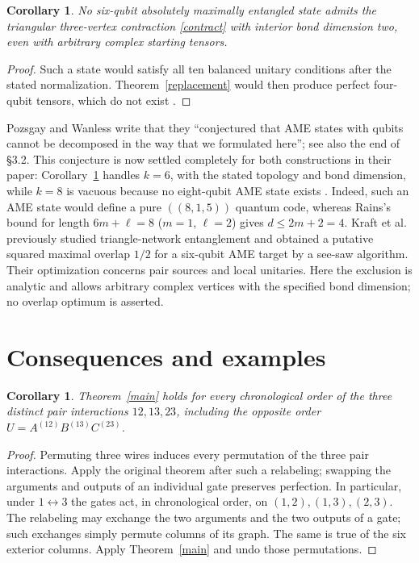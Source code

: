 \documentclass[11pt]{article}
\newtheorem{corollary}[theorem]{Corollary}
\begin{document}
\begin{corollary}\label{qubits}
No six-qubit absolutely maximally entangled state admits the triangular
three-vertex contraction \eqref{contract} with interior bond dimension
two, even with arbitrary complex starting tensors.
\end{corollary}
\begin{proof}
Such a state would satisfy all ten balanced unitary conditions after
the stated normalization. Theorem~\ref{replacement} would then produce
perfect four-qubit tensors, which do not exist
\cite[\S2]{HS}.
\end{proof}

Pozsgay and Wanless \cite[\S8]{PW} write that they ``conjectured that
AME states with qubits cannot be decomposed in the way that we
formulated here''; see also the end of \S3.2. This conjecture is now
settled completely for both constructions in their paper: Corollary~\ref{qubits}
handles $k=6$, with the stated topology and bond dimension, while $k=8$
is vacuous because no eight-qubit AME state exists
\cite[Theorem 14 in the arXiv version]{Rains}\cite[\S III, after Table I]{Scott}.
Indeed, such an AME state would define a pure $((8,1,5))$ quantum code,
whereas Rains's bound for length $6m+\ell=8$ ($m=1$, $\ell=2$) gives
$d\le 2m+2=4$.
Kraft et al.\ \cite[Table I]{Kraft}
previously studied triangle-network entanglement and obtained a
putative squared maximal overlap $1/2$ for a six-qubit AME target by a
see-saw algorithm. Their optimization concerns pair sources and local
unitaries. Here the exclusion is analytic and allows arbitrary complex
vertices with the specified bond dimension; no overlap optimum is asserted.

\section{Consequences and examples}
\begin{corollary}\label{reverse}
Theorem~\ref{main} holds for every chronological order of the three
distinct pair interactions $12,13,23$, including the opposite order
$U=A^{(12)}B^{(13)}C^{(23)}$.
\end{corollary}
\begin{proof}
Permuting three wires induces every permutation of the three pair
interactions. Apply the original theorem after such a relabeling;
swapping the arguments and outputs of an individual gate preserves
perfection. In particular, under $1\leftrightarrow3$ the gates act, in
chronological order, on $(1,2),(1,3),(2,3)$. The relabeling may exchange
the two arguments and the two outputs of a gate; such exchanges simply
permute columns of its graph. The same is true of the six exterior
columns. Apply Theorem~\ref{main} and undo those permutations.
\end{proof}
\end{document}
